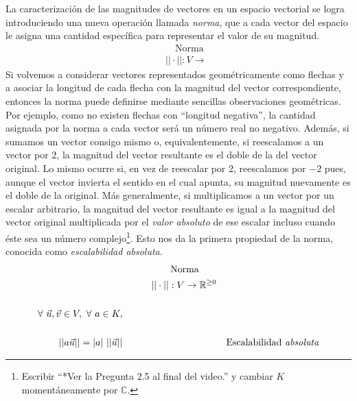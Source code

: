 \documentclass[12pt,dvipsnames]{article}
\numberwithin{equation}{section}
\begin{document}
La caracterización de las magnitudes de vectores en un espacio vectorial se logra introduciendo una nueva operación llamada \emph{norma}, que a cada vector del espacio le asigna una cantidad específica para representar el valor de su magnitud. 
\begin{align*}
     & & &\quad \text{Norma}& \\
     & & &||\cdot||:V\to &
\end{align*}
Si volvemos a considerar vectores representados geométricamente como flechas y a asociar la longitud de cada flecha con la magnitud del vector correspondiente, entonces la norma puede definirse mediante sencillas observaciones geométricas. Por ejemplo, como no existen flechas con ``longitud negativa'', la cantidad asignada por la norma a cada vector será un número real no negativo. Además, si sumamos un vector consigo mismo \textemdash o, equivalentemente, si reescalamos a un vector por $2$\textemdash, la magnitud del vector resultante es el doble de la del vector original. Lo mismo ocurre si, en vez de reescalar por $2$, reescalamos por $-2$ pues, aunque el vector invierta el sentido en el cual apunta, su magnitud nuevamente es el doble de la original. Más generalmente, si multiplicamos a un vector por un escalar arbitrario, la magnitud del vector resultante es igual a la magnitud del vector original multiplicada por el \emph{valor absoluto} de ese escalar \textemdash incluso cuando éste sea un número complejo\footnote{Escribir ``*Ver la Pregunta 2.5 al final del video.'' y cambiar $K$ momentáneamente por $\mathbb{C}$.}. Esto nos da la primera propiedad de la norma, conocida como \emph{escalabilidad absoluta}. %
\begin{align*}
     &\quad \quad \quad \quad \quad \text{Norma}& \\
     &\quad \quad \quad ||\cdot||:V\to \mathbb{R}^{\ge0}& \\
     \\
     \forall \ \vec{u},\vec{v}\in V, \ \forall \ a\in K, \\
    \\
    ||a\vec{u}|| = |a| \ ||\vec{u}|| &&\text{Escalabilidad \emph{absoluta}} \\
\end{align*}
\end{document}
